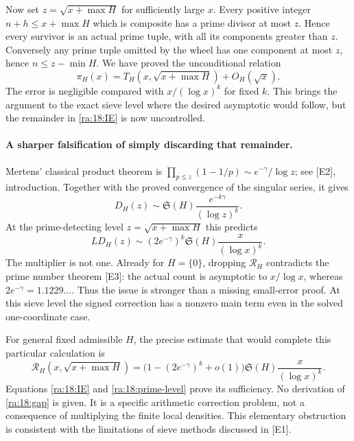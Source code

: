 \documentclass[11pt]{article}
\begin{document}
Now set $z=\sqrt{x+\max H}$ for sufficiently large $x$. Every positive
integer $n+h\le x+\max H$ which is composite has a prime divisor at
most $z$. Hence every survivor is an actual prime tuple, with all its
components greater than $z$. Conversely any prime tuple omitted by the
wheel has one component at most $z$, hence $n\le z-\min H$.
We have proved the unconditional relation
\begin{equation}\label{ra:18:prime-level}
 \pi_H(x)=T_H(x,\sqrt{x+\max H})+O_H(\sqrt x).
\end{equation}
The error is negligible compared with $x/(\log x)^k$ for fixed $k$.
This brings the argument to the exact sieve level where the desired
asymptotic would follow, but the remainder in \eqref{ra:18:IE} is now
uncontrolled.

\paragraph{A sharper falsification of simply discarding that remainder.}
Mertens' classical product theorem is
$\prod_{p\le z}(1-1/p)\sim e^{-\gamma}/\log z$; see [E2], introduction.
Together with the proved convergence of the singular series, it gives
\[
 D_H(z)\sim\mathfrak S(H)\frac{e^{-k\gamma}}{(\log z)^k}.
\]
At the prime-detecting level $z=\sqrt{x+\max H}$ this predicts
\[
 L D_H(z)\sim (2e^{-\gamma})^k\mathfrak S(H)
                          \frac{x}{(\log x)^k}.
\]
The multiplier is not one. Already for $H=\{0\}$, dropping
$\mathcal R_H$ contradicts the prime number theorem [E3]: the actual
count is asymptotic to $x/\log x$, whereas $2e^{-\gamma}=1.1229\ldots$.
Thus the issue is stronger than a missing small-error proof. At this
sieve level the signed correction has a nonzero main term even in the
solved one-coordinate case.

For general fixed admissible $H$, the precise estimate that would complete
this particular calculation is
\begin{equation}\label{ra:18:gap}
 \mathcal R_H(x,\sqrt{x+\max H})
 =\bigl(1-(2e^{-\gamma})^k+o(1)\bigr)
                  \mathfrak S(H)\frac{x}{(\log x)^k}.
\end{equation}
Equations \eqref{ra:18:IE} and \eqref{ra:18:prime-level} prove its
sufficiency. No derivation of \eqref{ra:18:gap} is given. It is a
specific arithmetic correction problem, not a consequence of multiplying
the finite local densities. This elementary obstruction is consistent
with the limitations of sieve methods discussed in [E1].
\end{document}

